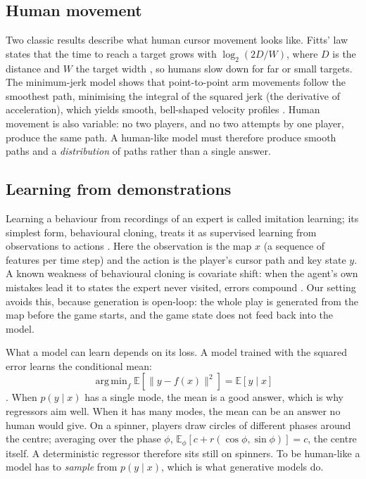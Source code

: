 \documentclass[11pt,a4paper]{article}
\DeclareMathOperator*{\argmin}{arg\,min}
\newcommand{\E}{\mathbb{E}}
\begin{document}
\subsection{Human movement}
Two classic results describe what human cursor movement looks like. Fitts' law states that the time to
reach a target grows with $\log_2(2D/W)$, where $D$ is the distance and $W$ the target width
\citep{fitts1954}, so humans slow down for far or small targets. The minimum-jerk model shows that point-to-point
arm movements follow the smoothest path, minimising the integral of the squared jerk (the derivative of
acceleration), which yields smooth, bell-shaped velocity profiles \citep{flash1985}. Human movement is also
variable: no two players, and no two attempts by one player, produce the same path. A human-like model must
therefore produce smooth paths and a \emph{distribution} of paths rather than a single answer.

\subsection{Learning from demonstrations}
Learning a behaviour from recordings of an expert is called imitation learning; its simplest form,
behavioural cloning, treats it as supervised learning from observations to actions \citep{pomerleau1989,
hussein2017}. Here the observation is the map $x$ (a sequence of features per time step) and the action is
the player's cursor path and key state $y$. A known weakness of behavioural cloning is covariate shift:
when the agent's own mistakes lead it to states the expert never visited, errors compound \citep{ross2011}.
Our setting avoids this, because generation is open-loop: the whole play is generated from the map before
the game starts, and the game state does not feed back into the model.

What a model can learn depends on its loss. A model trained with the squared error learns the
conditional mean:
\begin{equation}
  \argmin_f \E\left[\lVert y-f(x)\rVert^2\right] = \E[y \mid x]
  \label{eq:mean}
\end{equation}
\citep[Section 1.5.5]{bishop2006}. When $p(y\mid x)$ has a single mode, the mean is a good answer, which is
why regressors aim well. When it has many modes, the mean can be an answer no human would give. On a
spinner, players draw circles of different phases around the centre; averaging over the phase $\phi$,
$\E_\phi[c + r(\cos\phi,\sin\phi)] = c$, the centre itself. A deterministic regressor therefore sits still
on spinners. To be human-like a model has to \emph{sample} from $p(y\mid x)$, which is what generative models do.
\end{document}
